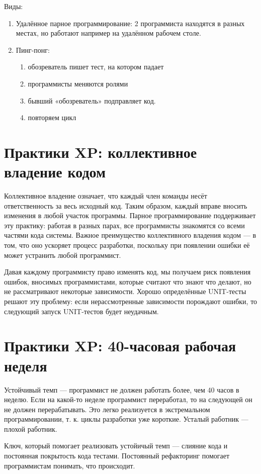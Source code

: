 \documentclass{article}
\begin{document}
    Виды:
    \begin{enumerate}
        \item Удалённое парное программирование: 2 программиста находятся в разных местах, но работают например на удалённом рабочем столе.
        \item Пинг-понг:
        \begin{enumerate}
            \item обозреватель пишет тест, на котором падает
            \item программисты меняются ролями
            \item бывший «обозреватель» подправляет код.
            \item повторяем цикл
        \end{enumerate}
    \end{enumerate}

\section{Практики XP: коллективное владение кодом}
    Коллективное владение означает, что каждый член команды несёт ответственность за весь исходный код. Таким образом, каждый вправе вносить изменения в любой участок программы. Парное программирование поддерживает эту практику: работая в разных парах, все программисты знакомятся со всеми частями кода системы. Важное преимущество коллективного владения кодом — в том, что оно ускоряет процесс разработки, поскольку при появлении ошибки её может устранить любой программист.

    Давая каждому программисту право изменять код, мы получаем риск появления ошибок, вносимых программистами, которые считают что знают что делают, но не рассматривают некоторые зависимости. Хорошо определённые UNIT-тесты решают эту проблему: если нерассмотренные зависимости порождают ошибки, то следующий запуск UNIT-тестов будет неудачным.

\section{Практики XP: 40-часовая рабочая неделя}
    Устойчивый темп — программист не должен работать более, чем 40 часов в неделю. Если на какой-то неделе программист переработал, то на следующей он не должен перерабатывать. Это легко реализуется в экстремальном программировании, т. к. циклы разработки уже короткие. Усталый работник — плохой работник.

    Ключ, который помогает реализовать устойичый темп — слияние кода и постоянная покрытость кода тестами. Постоянный рефакторинг помогает программистам понимать, что происходит.
\end{document}
